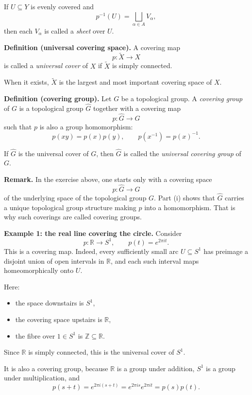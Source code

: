 \documentclass[12pt,a4paper]{article}
\theoremstyle{notespace}
\begin{document}
If \(U\subseteq Y\) is evenly covered and
\[
p^{-1}(U)=\bigsqcup_{\alpha\in A} V_\alpha,
\]
then each \(V_\alpha\) is called a \emph{sheet} over \(U\).

\medskip

\textbf{Definition (universal covering space).}
A covering map
\[
p:\widetilde{X}\to X
\]
is called a \emph{universal cover} of \(X\) if \(\widetilde{X}\) is simply connected.

When it exists, \(\widetilde{X}\) is the largest and most important covering space of \(X\).

\medskip

\textbf{Definition (covering group).}
Let \(G\) be a topological group. A \emph{covering group} of \(G\) is a topological group \(\widehat{G}\) together with a covering map
\[
p:\widehat{G}\to G
\]
such that \(p\) is also a group homomorphism:
\[
p(xy)=p(x)p(y),
\qquad
p(x^{-1})=p(x)^{-1}.
\]

If \(\widehat{G}\) is the universal cover of \(G\), then \(\widehat{G}\) is called the \emph{universal covering group} of \(G\).

\medskip

\textbf{Remark.}
In the exercise above, one starts only with a covering space
\[
p:\widehat{G}\to G
\]
of the underlying space of the topological group \(G\). Part (i) shows that \(\widehat{G}\) carries a unique topological group structure making \(p\) into a homomorphism. That is why such coverings are called covering groups.

\medskip

\textbf{Example 1: the real line covering the circle.}
Consider
\[
p:\mathbb R\to S^1,
\qquad
p(t)=e^{2\pi i t}.
\]
This is a covering map. Indeed, every sufficiently small arc \(U\subseteq S^1\) has preimage a disjoint union of open intervals in \(\mathbb R\), and each such interval maps homeomorphically onto \(U\).

Here:

\begin{itemize}
	\item the space downstairs is \(S^1\),
	\item the covering space upstairs is \(\mathbb R\),
	\item the fibre over \(1\in S^1\) is \(\mathbb Z\subseteq \mathbb R\).
\end{itemize}

Since \(\mathbb R\) is simply connected, this is the universal cover of \(S^1\).

It is also a covering group, because \(\mathbb R\) is a group under addition, \(S^1\) is a group under multiplication, and
\[
p(s+t)=e^{2\pi i(s+t)}=e^{2\pi i s}e^{2\pi i t}=p(s)p(t).
\]
\end{document}
